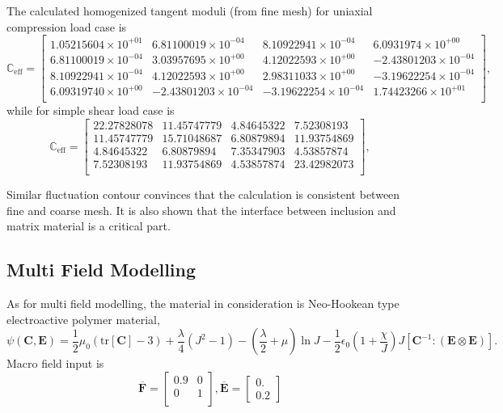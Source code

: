 The calculated homogenized tangent moduli (from fine mesh) for uniaxial compression load case is 
\begin{equation}
\mathbb{C}_{\text{eff}} = 
\begin{bmatrix}
1.05215604 \times 10^{+01} &  6.81100019\times 10^{-04}  & 8.10922941\times 10^{-04} & 6.0931974\times 10^{+00} \\
6.81100019\times 10^{-04} &  3.03957695\times 10^{+00} &  4.12022593\times 10^{+00} & -2.43801203\times 10^{-04}\\
8.10922941\times 10^{-04} &  4.12022593\times 10^{+00} &  2.98311033\times 10^{+00} & -3.19622254\times 10^{-04}\\
6.09319740\times 10^{+00} & -2.43801203\times 10^{-04} & -3.19622254\times 10^{-04} &  1.74423266\times 10^{+01}\\
\end{bmatrix},
\end{equation}
while for simple shear load case is 
\begin{equation}
\mathbb{C}_{\text{eff}} = 
\begin{bmatrix}
22.27828078 & 11.45747779 &  4.84645322 &  7.52308193 \\
11.45747779 & 15.71048687 &  6.80879894 & 11.93754869 \\
4.84645322 &  6.80879894  & 7.35347903 &  4.53857874 \\
7.52308193 & 11.93754869 &  4.53857874 & 23.42982073 \\
\end{bmatrix},
\end{equation}

Similar fluctuation contour convinces that the calculation is consistent between fine and coarse mesh. It is also shown that the interface between inclusion and matrix material is a critical part.

\subsection{Multi Field Modelling}
As for multi field modelling, the material in consideration is Neo-Hookean type electroactive polymer material, 
\begin{equation}
\label{eq: nhk}
\psi\left( \mathbf{C}, \mathbf{E} \right) =  \frac{1}{2}\mu_{0} \left( \text{tr}[\mathbf{C}]-3 \right) + \dfrac{\lambda}{4} \left( J^{2}-1 \right) - \left( \dfrac{\lambda}{2} + \mu \right) \ln J - \frac{1}{2} \epsilon_{0} \left( 1+\dfrac{\chi}{J} \right) J \left[ \mathbf{C}^{-1}: (\mathbf{E} \otimes \mathbf{E}) \right].
\end{equation}
Macro field input is 
\[
\overbar{\mathbf{F}} = 
\begin{bmatrix}
0.9 & 0 \\
0 & 1 \\
\end{bmatrix},
\overbar{\mathbf{E}} = 
\begin{bmatrix}
0. \\
0.2
\end{bmatrix}
\]

